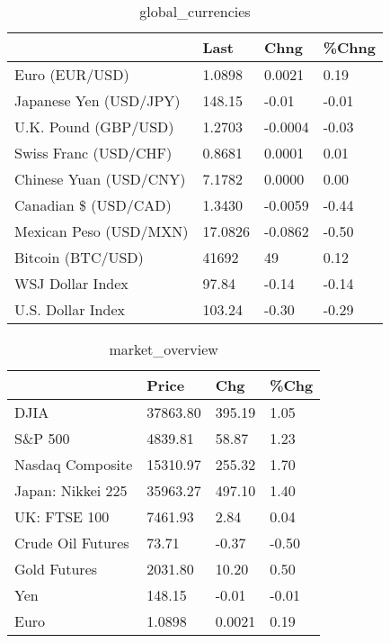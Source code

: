 \documentclass{article}%
\begin{document}
%


\begin{table}[htbp]%
\caption{global\_currencies}%
\centering%
\begin{adjustbox}{width=1\textwidth}%
\begin{tabular}{llll}
\toprule
                       &    Last &    Chng & \%Chng \\
\midrule
        Euro (EUR/USD) &  1.0898 &  0.0021 &  0.19 \\
Japanese Yen (USD/JPY) &  148.15 &   -0.01 & -0.01 \\
  U.K. Pound (GBP/USD) &  1.2703 & -0.0004 & -0.03 \\
 Swiss Franc (USD/CHF) &  0.8681 &  0.0001 &  0.01 \\
Chinese Yuan (USD/CNY) &  7.1782 &  0.0000 &  0.00 \\
  Canadian \$ (USD/CAD) &  1.3430 & -0.0059 & -0.44 \\
Mexican Peso (USD/MXN) & 17.0826 & -0.0862 & -0.50 \\
     Bitcoin (BTC/USD) &   41692 &      49 &  0.12 \\
      WSJ Dollar Index &   97.84 &   -0.14 & -0.14 \\
     U.S. Dollar Index &  103.24 &   -0.30 & -0.29 \\
\bottomrule
\end{tabular}
%
\end{adjustbox}%
\end{table}

%


\begin{table}[htbp]%
\caption{market\_overview}%
\centering%
\begin{adjustbox}{width=1\textwidth}%
\begin{tabular}{llll}
\toprule
                  &    Price &    Chg &  \%Chg \\
\midrule
             DJIA & 37863.80 & 395.19 &  1.05 \\
          S\&P 500 &  4839.81 &  58.87 &  1.23 \\
 Nasdaq Composite & 15310.97 & 255.32 &  1.70 \\
Japan: Nikkei 225 & 35963.27 & 497.10 &  1.40 \\
     UK: FTSE 100 &  7461.93 &   2.84 &  0.04 \\
Crude Oil Futures &    73.71 &  -0.37 & -0.50 \\
     Gold Futures &  2031.80 &  10.20 &  0.50 \\
              Yen &   148.15 &  -0.01 & -0.01 \\
             Euro &   1.0898 & 0.0021 &  0.19 \\
\bottomrule
\end{tabular}
%
\end{adjustbox}%
\end{table}

%
\end{document}
